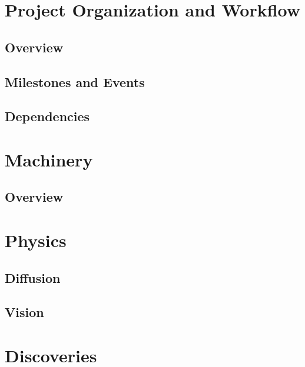 \documentclass[10pt,a4paper]{report}
\begin{document}


\tableofcontents

\newpage
{}
{}
\lstlistoflistings

{}
{}
\listoffigures


\part{Project Organization and Workflow}
	\chapter{Overview}\label{ch:overview}
		
	\chapter{Milestones and Events}\label{ch:events}
		
	\chapter{Dependencies}


\part{Machinery}
	\chapter{Overview}\label{chp:genetics}
		

\part{Physics}
	\chapter{Diffusion}
	\chapter{Vision}
\part{Discoveries}







% 		

\printglossary[nonumberlist]
\end{document}
